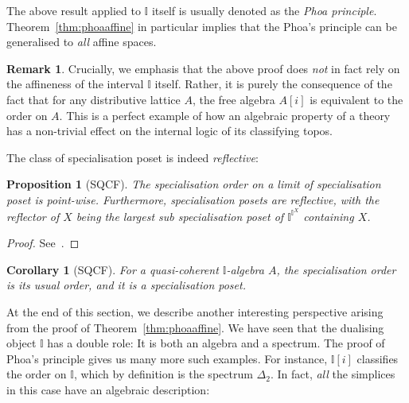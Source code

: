 \documentclass[12pt]{amsart}
\newtheorem{corollary}[theorem]{Corollary}
\newtheorem{proposition}[theorem]{Proposition}
\theoremstyle{definition}
\newtheorem{remark}[theorem]{Remark}
\newcommand{\mbb}[1]{\mathbb{#1}}
\newcommand{\I}{\mbb I}
\begin{document}
The above result applied to $\I$ itself is usually denoted as the \emph{Phoa principle}. Theorem~\ref{thm:phoaaffine} in particular implies that the Phoa's principle can be generalised to \emph{all} affine spaces.

\begin{remark}
  Crucially, we emphasis that the above proof does \emph{not} in fact rely on the affineness of the interval $\I$ itself. Rather, it is purely the consequence of the fact that for any distributive lattice $A$, the free algebra $A[i]$ is equivalent to the order on $A$. This is a perfect example of how an algebraic property of a theory has a non-trivial effect on the internal logic of its classifying topos.
\end{remark}

The class of specialisation poset is indeed \emph{reflective}:

\begin{proposition}[SQCF]\label{prop:phoaexponential}
  The specialisation order on a limit of specialisation poset is point-wise. Furthermore, specialisation posets are reflective, with the reflector of $X$ being the largest sub specialisation poset of $\I^{\I^X}$ containing $X$.
\end{proposition}
\begin{proof}
  See~\cite[Sec. 5.4]{PhoaWesleyKym-Son1991DtiR}.
\end{proof}

\begin{corollary}[SQCF]
  For a quasi-coherent $\I$-algebra $A$, the specialisation order is its usual order, and it is a specialisation poset.
\end{corollary}

At the end of this section, we describe another interesting perspective arising from the proof of Theorem~\ref{thm:phoaaffine}. We have seen that the dualising object $\I$ has a double role: It is both an algebra and a spectrum. The proof of Phoa's principle gives us many more such examples. For instance, $\I[i]$ classifies the order on $\I$, which by definition is the spectrum $\Delta_2$. In fact, \emph{all} the simplices in this case have an algebraic description:
\end{document}
